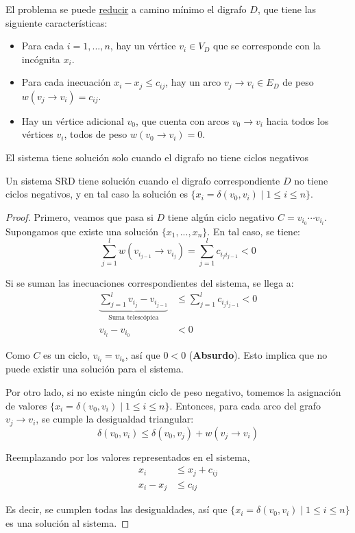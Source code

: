 El problema se puede \hyperref[reducciones]{reducir} a camino mínimo el digrafo $D$, que tiene las siguiente características:
\begin{itemize}
    \item Para cada $i = 1, ..., n$, hay un vértice $v_i \in V_D$ que se corresponde con la incógnita $x_i$.
    \item Para cada inecuación $x_i - x_j \leq c_{ij}$, hay un arco $v_j \rightarrow v_i \in E_D$ de peso $w(v_j \rightarrow v_i) = c_{ij}$.
    \item Hay un vértice adicional $v_0$, que cuenta con arcos $v_0 \rightarrow v_i$ hacia todos los vértices $v_i$, todos de peso $w(v_0 \rightarrow v_i) = 0$.
\end{itemize}

El sistema tiene solución solo cuando el digrafo no tiene ciclos negativos

\begin{theorem*}
    Un sistema SRD tiene solución cuando el digrafo correspondiente $D$ no tiene ciclos negativos, y en tal caso la solución es $\{x_i = \delta(v_0, v_i) \mid 1 \leq i \leq n\}$.
\end{theorem*}
\begin{proof}
    Primero, veamos que pasa si $D$ tiene algún ciclo negativo $C = v_{i_0} \cdots v_{i_l}$. Supongamos que existe una solución $\{x_1, ..., x_n\}$. En tal caso, se tiene:
    $$\sum_{j = 1}^l w(v_{i_{j - 1}} \rightarrow v_{i_j}) = \sum_{j = 1}^l c_{i_j i_{j - 1}} < 0$$

    Si se suman las inecuaciones correspondientes del sistema, se llega a:
    \begin{align*}
        \underbrace{\sum_{j = 1}^l v_{i_j} - v_{i_{j - 1}}}_{\text{Suma telescópica}} & \leq \sum_{j = 1}^l c_{i_j i_{j - 1}} < 0 \\
        v_{i_l} - v_{i_0}                                                             & < 0
    \end{align*}

    Como $C$ es un ciclo, $v_{i_l} = v_{i_0}$, así que $0 < 0$ (\textbf{Absurdo}). Esto implica que no puede existir una solución para el sistema.

    Por otro lado, si no existe ningún ciclo de peso negativo, tomemos la asignación de valores $\{x_i = \delta(v_0, v_i) \mid 1 \leq i \leq n\}$. Entonces, para cada arco del grafo $v_j \rightarrow v_i$, se cumple la desigualdad triangular:
    $$\delta(v_0, v_i) \leq \delta(v_0, v_j) + w(v_j \rightarrow v_i)$$

    Reemplazando por los valores representados en el sistema,
    \begin{align*}
        x_i       & \leq x_j + c_{ij} \\
        x_i - x_j & \leq c_{ij}
    \end{align*}

    Es decir, se cumplen todas las desigualdades, así que $\{x_i = \delta(v_0, v_i) \mid 1 \leq i \leq n\}$ es una solución al sistema.

\end{proof}

